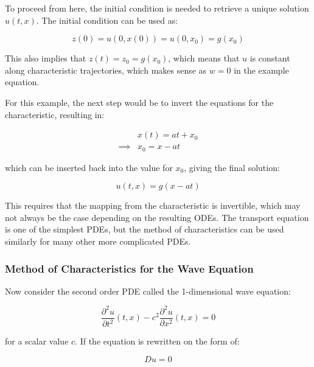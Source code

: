 To proceed from here, the initial condition is needed to retrieve a unique solution $u(t, x)$. The initial condition can be used as:

\begin{equation}
    z(0) = u(0, x(0)) = u(0, x_0) = g(x_0)
\end{equation}

This also implies that $z(t) = z_0 = g(x_0)$, which means that $u$ is constant along characteristic trajectories, which makes sense as $w = 0$ in the example equation.

For this example, the next step would be to invert the equations for the characteristic, resulting in:

\begin{equation}
    \begin{aligned}
        & x(t) = a t + x_0 \\
        \implies & x_0 = x - a t
    \end{aligned}
\end{equation}

\noindent which can be inserted back into the value for $x_0$, giving the final solution:

\begin{equation}
    u(t, x) = g(x - a t)
\end{equation}

This requires that the mapping from the characteristic is invertible, which may not always be the case depending on the resulting ODEs. The transport equation is one of the simplest PDEs, but the method of characteristics can be used similarly for many other more complicated PDEs.




\iffalse
\subsubsection{Method of Characteristics for the Wave Equation}

Now consider the second order PDE called the 1-dimensional wave equation:

\begin{equation}
    \frac{\partial^2 u}{\partial t^2} (t, x) - c^2 \frac{\partial^2 u}{\partial x^2} (t, x) = 0
\end{equation}

\noindent for a scalar value $c$. If the equation is rewritten on the form of:

\begin{equation}
    D u = 0
\end{equation}

